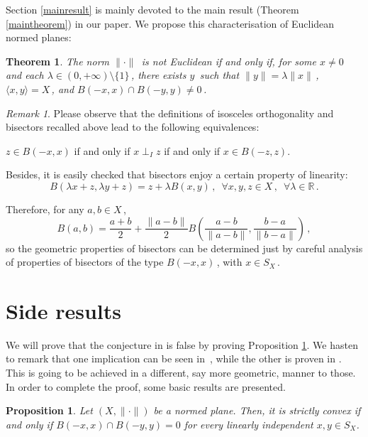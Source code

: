 \documentclass[12pt]{amsproc}
\newtheorem*{theorem-non}{Theorem}
\newtheorem{proposition}[theorem]{Proposition}
\theoremstyle{remark}
\newtheorem{nota}[theorem]{Remark}
\def\norma{\|\cdot\|}
\begin{document}
\medskip

Section \ref{mainresult} is mainly devoted to the main result (Theorem \ref{maintheorem}) in our paper. We propose this characterisation of Euclidean normed planes:

\begin{theorem-non}
The norm $\norma\,$ is not Euclidean if and only if, for some $x\neq 0\,$ and each 
$\lambda\in (0,+\infty)\setminus \{1\}\,$, there exists $y\,$ such that 
$\|y\|=\lambda \|x\|\,$, $\langle x,y\rangle =X\,$, and $B(-x,x)\cap B(-y,y)\neq 0\,$.
\end{theorem-non}

\bigskip
 
\begin{nota}\label{lalinealidaddelbisector}
Please observe that the definitions of isosceles orthogonality and bisectors recalled above lead to the following equivalences: 

\noindent $z\in B(-x,x)$ if and only if $x\perp_I z$ if and only if $x\in B(-z,z)$. 

Besides, it is easily checked that bisectors enjoy a certain property of linearity:
$$
B(\lambda x+z,\lambda y+z)=z+\lambda B(x,y)\,,\,\,\,\forall x,y,z\in X\,,\,\,\,\forall \lambda \in \mathbb{R}\,.
$$

Therefore, for any $a,b\in X\,$, 
$$
B(a,b)=\frac{a+b}{2}+\frac{\|a-b\|}{2}B\left(\frac{a-b}{\|a-b\|},\frac{b-a}{\|b-a\|}\right)\,,
$$
so the geometric properties of bisectors can be determined just by careful analysis of properties of bisectors of the type $B(-x,x)\,$, with $x\in S_X\,$.
\end{nota}

\medskip

\section{Side results}\label{sideresults}

We will prove that the conjecture in \cite[Conj. 5.3.]{alonso2012birkhoff} 
is false by proving Proposition \ref{anticonjetura}. We hasten to remark 
that one implication can be seen in~\cite[Proposition 5]{alonso1994}, 
while the other is proven in \cite[Corollary 2.5]{jiliwu2011}. This is going to be 
achieved in a different, say more geometric, manner to those. 
In order to complete the proof, some basic results are presented.

\begin{proposition}\label{anticonjetura}
Let $(X,\|\cdot\|)$ be a normed plane. Then, it is strictly convex if and only if 
$B(-x,x)\cap B(-y,y)=0$ for every linearly independent $x, y\in S_X$. 
\end{proposition}
\end{document}
